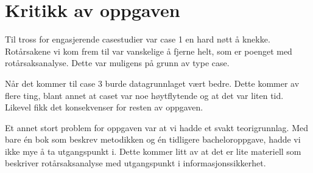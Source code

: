 \section{Kritikk av oppgaven}
Til tross for engasjerende casestudier var case 1 en hard nøtt å knekke. Rotårsakene vi kom frem til var vanskelige å fjerne helt, som er poenget med rotårsaksanalyse. Dette var muligens på grunn av type case. 

Når det kommer til case 3 burde datagrunnlaget vært bedre. Dette kommer av flere ting, blant annet at caset var noe høytflytende og at det var liten tid. Likevel fikk det konsekvenser for resten av oppgaven. 

Et annet stort problem for oppgaven var at vi hadde et svakt teorigrunnlag. Med bare én bok som beskrev metodikken og én tidligere bacheloroppgave, hadde vi ikke mye å ta utgangspunkt i. Dette kommer litt av at det er lite materiell som beskriver rotårsaksanalyse med utgangspunkt i informasjonssikkerhet. 
